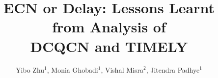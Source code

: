 \documentclass{sig-alternate-10pt}
\begin{document}

\title{ECN or Delay: Lessons Learnt from Analysis of\\DCQCN and TIMELY}

\author{Yibo Zhu$^1$, Monia Ghobadi$^1$, Vishal Misra$^2$, Jitendra Padhye$^1$\\
\\
}
\maketitle


%




%



\clearpage



%
\end{document}
